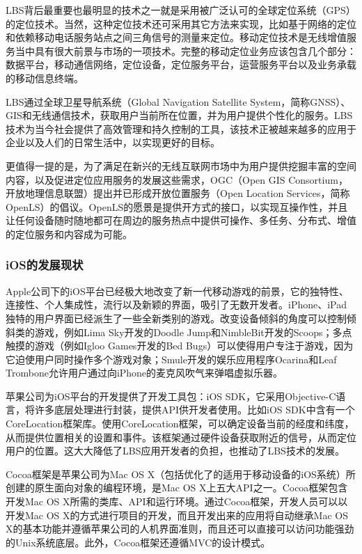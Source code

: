 \documentclass{article}
\begin{document}
\begin{CJK}{UTF8}{gbsn}
  LBS背后最重要也最明显的技术之一就是采用被广泛认可的全球定位系统（GPS）的定位技术。当然，这种定位技术还可采用其它方法来实现，比如基于网络的定位和依赖移动电话服务站点之间三角信号的测量来定位\cite{L01}。移动定位技术是无线增值服务当中具有很大前景与市场的一项技术。完整的移动定位业务应该包含几个部分：数据平台，移动通信网络，定位设备，定位服务平台，运营服务平台以及业务承载的移动信息终端\cite{L07}。

  LBS通过全球卫星导航系统（Global Navigation Satellite System，简称GNSS）、GIS和无线通信技术，获取用户当前所在位置，并为用户提供个性化的服务。LBS技术为当今社会提供了高效管理和持久控制的工具，该技术正被越来越多的应用于企业以及人们的日常生活中，以实现更好的目标\cite{L01}。

  更值得一提的是，为了满足在新兴的无线互联网市场中为用户提供挖掘丰富的空间内容，以及促进定位应用服务的发展这些需求，OGC（Open GIS Consortium，开放地理信息联盟）提出并已形成开放位置服务（Open Location Services，简称OpenLS）的倡议。OpenLS的愿景是提供开方式的接口，以实现互操作性，并且让任何设备随时随地都可在周边的服务热点中提供可操作、多任务、分布式、增值的定位服务和内容成为可能\cite{L13}。

	\subsubsection{iOS的发展现状}
  Apple公司下的iOS平台已经极大地改变了新一代移动游戏的前景，它的独特性、连接性、个人集成性，流行以及新颖的界面，吸引了无数开发者。iPhone、iPad独特的用户界面已经派生了一些全新类别的游戏。改变设备倾斜的角度可以控制倾斜类的游戏，例如Lima Sky开发的Doodle Jump和NimbleBit开发的Scoops；多点触摸的游戏（例如Igloo Games开发的Bed Bugs）可以使得用户专注于游戏，因为它迫使用户同时操作多个游戏对象；Smule开发的娱乐应用程序Ocarina和Leaf Trombone允许用户通过向iPhone的麦克风吹气来弹唱虚拟乐器\cite{B02}。

  苹果公司为iOS平台的开发提供了开发工具包：iOS SDK，它采用Objective-C语言，将许多底层处理进行封装，提供API供开发者使用。比如iOS SDK中含有一个CoreLocation框架库。使用CoreLocation框架，可以确定设备当前的经度和纬度，从而提供位置相关的设置和事件。该框架通过硬件设备获取附近的信号，从而定位用户的位置\cite{iOSLIB}。这大大降低了LBS应用开发者的负担，也推动了LBS技术的发展。

  Cocoa框架是苹果公司为Mac OS X（包括优化了的适用于移动设备的iOS系统）所创建的原生面向对象的编程环境，是Mac OS X上五大API之一。Cocoa框架包含开发Mac OS X所需的类库、API和运行环境。通过Cocoa框架，开发人员可以以开发Mac OS X的方式进行项目的开发，而且开发出来的应用将自动继承Mac OS X的基本功能并遵循苹果公司的人机界面准则，而且还可以直接可以访问功能强劲的Unix系统底层\cite{MAN_Cocoa}。此外，Cocoa框架还遵循MVC的设计模式。


\end{CJK}
\end{document}
